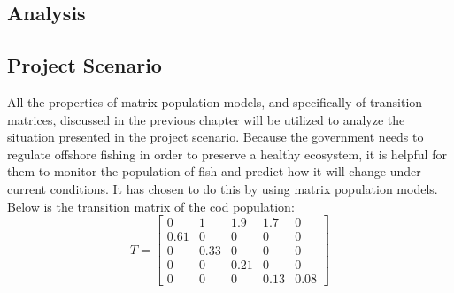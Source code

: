\documentclass{article}
\begin{document}

    \newpage
    \begin{center}
        \section{Analysis}\label{sec:analysis}
    \end{center}

    \subsection{Project Scenario}\label{subsec:project-scenario}

    All the properties of matrix population models, and specifically of transition matrices, discussed in the previous chapter will be utilized to analyze the situation presented in the project scenario.
    Because the government needs to regulate offshore fishing in order to preserve a healthy ecosystem, it is helpful for them to monitor the population of fish and predict how it will change under current conditions.
    It has chosen to do this by using matrix population models.
    Below is the transition matrix of the cod population:
    \begin{equation}
        T =
        \begin{bmatrix}
            0    & 1   & 1.9 & 1.7 & 0   \\
            0.61 & 0   & 0   & 0   & 0   \\
            0   & 0.33 & 0   & 0   & 0   \\
            0   & 0   & 0.21 & 0   & 0   \\
            0   & 0   & 0   & 0.13 & 0.08
        \end{bmatrix}\label{eq:equation13}
    \end{equation}
\end{document}
